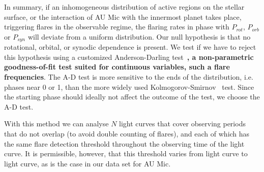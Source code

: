 \documentclass[fleqn,usenatbib]{mnras}%
\begin{document}
In summary, if an inhomogeneous distribution of active regions on the stellar surface, or the interaction of AU Mic with the innermost planet takes place, triggering flares in the observable regime, the flaring rates in phase with $P_{rot}$, $P_{orb}$ or $P_{syn}$  will deviate from a uniform distribution. Our null hypothesis is that no rotational, orbital, or synodic dependence is present. We test if we have to reject this hypothesis using a customized Anderson-Darling test~\citep[\mbox{A-D} test,][]{anderson1952, stephens1974edf}\textbf{, a non-parametric goodness-of-fit test suited for continuous variables, such a flare frequencies}. The \mbox{A-D} test is more sensitive to the ends of the distribution, i.e. phases near 0 or 1, than the more widely used Kolmogorov-Smirnov~\citep{kolmogorov1933sulla,smirnov1948table} test. Since the starting phase should ideally not affect the outcome of the test, we choose the \mbox{A-D} test.

With this method we can analyse $N$ light curves that cover observing periods that do not overlap (to avoid double counting of flares), and each of which has the same flare detection threshold throughout the observing time of the light curve. It is permissible, however, that this threshold varies from light curve to light curve, as is the case in our data set for AU Mic.
 
\end{document}
